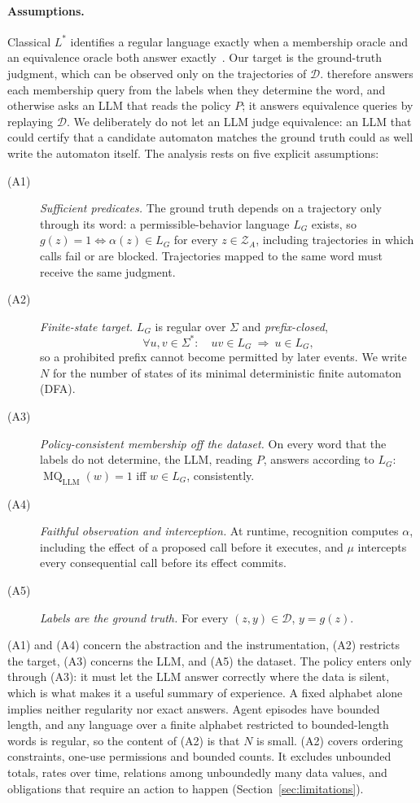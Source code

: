 \paragraph{Assumptions.}
Classical $L^*$ identifies a regular language exactly when a membership oracle and an equivalence oracle both answer exactly~\cite{angluin1987learning}. Our target is the ground-truth judgment, which can be observed only on the trajectories of $\mathcal{D}$. \system therefore answers each membership query from the labels when they determine the word, and otherwise asks an LLM that reads the policy $P$; it answers equivalence queries by replaying $\mathcal{D}$. We deliberately do not let an LLM judge equivalence: an LLM that could certify that a candidate automaton matches the ground truth could as well write the automaton itself. The analysis rests on five explicit assumptions:
\begin{description}
  \item[(A1)] \emph{Sufficient predicates.} The ground truth depends on a trajectory only through its word: a permissible-behavior language $L_G$ exists, so $g(z)=1\iff\alpha(z)\in L_G$ for every $z\in\mathcal{Z}_A$, including trajectories in which calls fail or are blocked. Trajectories mapped to the same word must receive the same judgment.
  \item[(A2)] \emph{Finite-state target.} $L_G$ is regular over $\Sigma$ and \emph{prefix-closed},
  \[
   \forall u,v\in\Sigma^*:\quad uv\in L_G\ \Longrightarrow\ u\in L_G,
  \]
  so a prohibited prefix cannot become permitted by later events. We write $N$ for the number of states of its minimal deterministic finite automaton (DFA).
  \item[(A3)] \emph{Policy-consistent membership off the dataset.} On every word that the labels do not determine, the LLM, reading $P$, answers according to $L_G$: $\operatorname{MQ}_{\mathrm{LLM}}(w)=1$ iff $w\in L_G$, consistently.
  \item[(A4)] \emph{Faithful observation and interception.} At runtime, recognition computes $\alpha$, including the effect of a proposed call before it executes, and $\mu$ intercepts every consequential call before its effect commits.
  \item[(A5)] \emph{Labels are the ground truth.} For every $(z,y)\in\mathcal{D}$, $y=g(z)$.
\end{description}
(A1) and (A4) concern the abstraction and the instrumentation, (A2) restricts the target, (A3) concerns the LLM, and (A5) the dataset. The policy enters only through (A3): it must let the LLM answer correctly where the data is silent, which is what makes it a useful summary of experience. A fixed alphabet alone implies neither regularity nor exact answers. Agent episodes have bounded length, and any language over a finite alphabet restricted to bounded-length words is regular, so the content of (A2) is that $N$ is small. (A2) covers ordering constraints, one-use permissions and bounded counts. It excludes unbounded totals, rates over time, relations among unboundedly many data values, and obligations that require an action to happen (Section~\ref{sec:limitations}).


